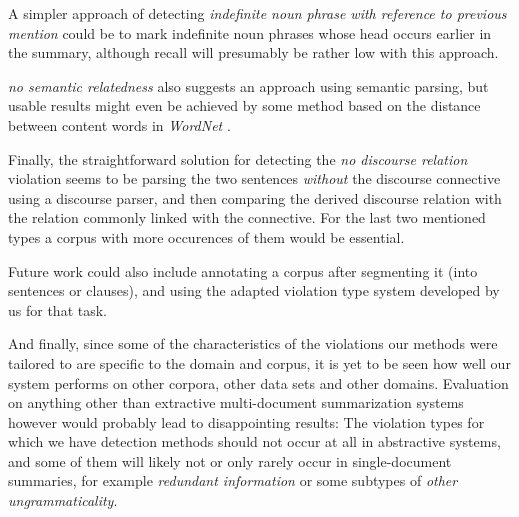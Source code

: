 \documentclass[a4paper,10pt]{scrartcl}
\theoremstyle{style}
\begin{document}
A simpler approach of detecting \textit{indefinite noun phrase with reference to previous mention} could be to mark indefinite noun phrases whose head occurs earlier in the summary, although recall will presumably be rather low with this approach.

\textit{no semantic relatedness} also suggests an approach using semantic parsing, but usable results might even be achieved by some method based on the distance between content words in \textit{WordNet} \citep{fellbaum2005wordnet}.

Finally, the straightforward solution for detecting the \textit{no discourse relation} violation seems to be parsing the two sentences \textit{without} the discourse connective using a discourse parser, and then comparing the derived discourse relation with the relation commonly linked with the connective. For the last two mentioned types a corpus with more occurences of them would be essential.

Future work could also include annotating a corpus after segmenting it (into sentences or clauses), and using the adapted violation type system developed by us for that task.

And finally, since some of the characteristics of the violations our methods were tailored to are specific to the domain and corpus, it is yet to be seen how well our system performs on other corpora, other data sets and other domains.
Evaluation on anything other than extractive multi-document summarization systems however would probably lead to disappointing results: The violation types for which we have detection methods should not occur at all in abstractive systems, and some of them will likely not or only rarely occur in single-document summaries, for example \textit{redundant information} or some subtypes of \textit{other ungrammaticality}.

\newpage


\end{document}
